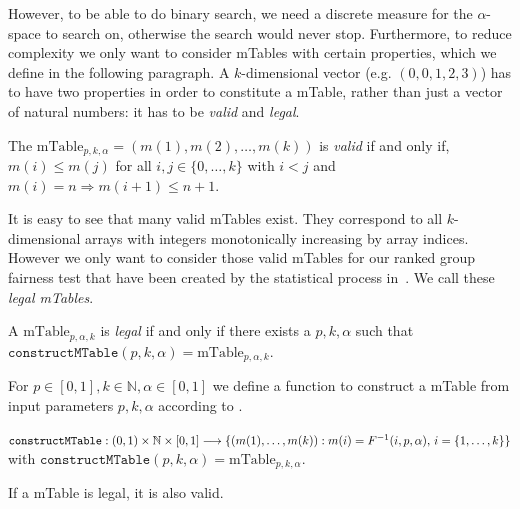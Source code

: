However, to be able to do binary search, we need a discrete measure for the $\alpha$-space to search on, otherwise the search would never stop.
%
Furthermore, to reduce complexity we only want to consider mTables with certain properties, which we define in the following paragraph. 
%
A $k$-dimensional vector (e.g. $(0,0,1,2,3)$) has to have two properties in order to constitute a mTable, rather than just a vector of natural numbers: it has to be \emph{valid} and \emph{legal}.
%
\begin{definition}
	\label{def:05:valid-mtable}
	The $\text{mTable}_{p,k,\alpha}=(m(1) , m(2) , \ldots , m(k))$ is \emph{valid} if and only if, $m(i) \leq m(j)$ for all $i,j \in \lbrace 0, \ldots, k \rbrace$ with $i < j$ and $m(i)=n \Rightarrow m(i+1) \leq n+1$.
\end{definition}
\noindent It is easy to see that many valid mTables exist.
%
They correspond to all $k$-dimensional arrays with integers monotonically increasing by array indices.
%
However we only want to consider those valid mTables for our ranked group fairness test that have been created by the statistical process in~\citet{yang2016measuring}.
%
We call these \textit{legal mTables}.
%
\begin{definition}
	\label{def:05:legal-mtable}
	A $\text{mTable}_{p,\alpha,k}$ is \textit{legal} if and only if there exists a $p,k,\alpha$ such that
	$\texttt{constructMTable}(p,k,\alpha)=\text{mTable}_{p,\alpha,k}$.
\end{definition}
%
\begin{definition}[constructMTable]
	\label{def:05:construct-mtable-single-test}
	For $p\in [0,1], k \in \mathbb{N}, \alpha \in [0,1]$ we define a function to construct a mTable from input parameters $p, k, \alpha$ according to \cite{yang2016measuring}.
	
	\noindent$\texttt{constructMTable} : \\ (0,1) \times \mathbb{N} \times [0,1] \longrightarrow \lbrace (m(1) ,\ldots, m(k)): m(i) = F^{-1}(i,p,\alpha), \, i = \{1,\ldots,k\}\rbrace$ \\
	with $\texttt{constructMTable}(p,k,\alpha)=\text{mTable}_{p,k,\alpha}$.
\end{definition}
%
\begin{lemma}
	\label{lemma:05:legal-valid-mtable}
	If a mTable is legal, it is also valid.
\end{lemma}

